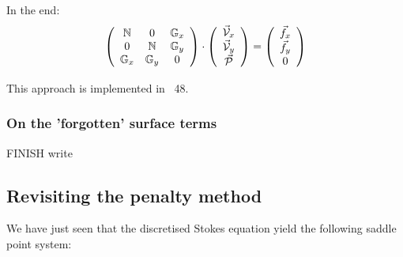 In the end:
\[
\left(
\begin{array}{ccc}
{{\mathbb{N}}} & 0 & {{\mathbb{G}}}_x  \\
0 & {{\mathbb{N}}} & {{\mathbb{G}}}_y  \\
{\mathbb{G}}_x & {\mathbb{G}}_y & 0 
\end{array}
\right)
\cdot
\left(
\begin{array}{c}
\vec{\cal V}_x \\
\vec{\cal V}_y \\
\vec{\cal P} 
\end{array}
\right)
=
\left(
\begin{array}{c}
\vec{f}_x \\
\vec{f}_y \\
0
\end{array}
\right)
\]

This approach is implemented in \stone~48. 






\subsubsection{On the 'forgotten' surface terms}

FINISH write

\subsection{Revisiting the penalty method}

We have just seen that the discretised Stokes equation yield the 
following saddle point system:



